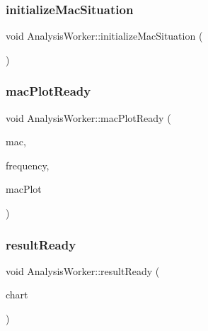 \subsubsection{\texorpdfstring{initialize\+Mac\+Situation}{initializeMacSituation}}
{\footnotesize\ttfamily void Analysis\+Worker\+::initialize\+Mac\+Situation (\begin{DoxyParamCaption}{ }\end{DoxyParamCaption})\hspace{0.3cm}{\ttfamily [signal]}}

\mbox{\label{class_analysis_worker_a44e7df8efd66c1b071d6f43a313ed6ef}} 
\subsubsection{\texorpdfstring{mac\+Plot\+Ready}{macPlotReady}}
{\footnotesize\ttfamily void Analysis\+Worker\+::mac\+Plot\+Ready (\begin{DoxyParamCaption}\item[{Q\+String\+List}]{mac,  }\item[{Q\+String\+List}]{frequency,  }\item[{\hyperlink{class_mac_chart}{Mac\+Chart} $\ast$}]{mac\+Plot }\end{DoxyParamCaption})\hspace{0.3cm}{\ttfamily [signal]}}

\mbox{\label{class_analysis_worker_aa02712f415266b80f078a65ef45defe9}} 
\subsubsection{\texorpdfstring{result\+Ready}{resultReady}}
{\footnotesize\ttfamily void Analysis\+Worker\+::result\+Ready (\begin{DoxyParamCaption}\item[{\hyperlink{class_monitoring_chart}{Monitoring\+Chart} $\ast$}]{chart }\end{DoxyParamCaption})\hspace{0.3cm}{\ttfamily [signal]}}

\mbox{\label{class_analysis_worker_a4a7f46d081dfd2872a498f1183581ea9}} 
